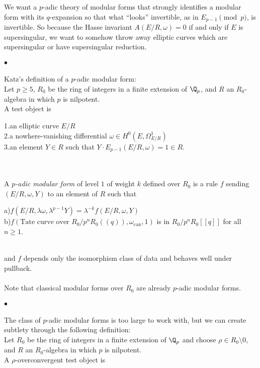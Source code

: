 \documentclass[12pt]{article}
\begin{document}
We want a $p$-adic theory of modular forms that strongly identifies a
modular form with its $q$-expansion so that what ``looks'' invertible, as in
$E_{p-1} \pmod{p}$, is invertible.
So because the Hasse invariant $A(E/R,\omega) = 0$ if and only if $E$ is
supersingular, we want to somehow throw away elliptic curves which are
supersingular or have supersingular reduction.

\paragraph{$\bullet$}
Katz's definition of a $p$-adic modular form:\\
Let $p \geq 5$, $R_0$ be the ring of integers in a finite extension of
$\Q_p$, and $R$ an $R_0$-algebra in which $p$ is nilpotent.
\\
A test object is

\begin{minipage}[c]{6in}
1.\en an elliptic curve $E/R$\\
2.\en a nowhere-vanishing differential $\omega \in H^0(E,\Omega^1_{E/R})$\\
3.\en an element $Y \in R$ such that $Y \cdot E_{p-1}(E/R,\omega) = 1 \in
R$.
\end{minipage}
\\
\\
A \emph{$p$-adic modular form} of level $1$ of weight $k$ defined over $R_0$
is a rule $f$ sending $(E/R,\omega,Y)$ to an element of $R$ such that

\begin{minipage}[c]{6in}
a)\en $f(E/R,\lambda \omega, \lambda^{p-1} Y) = \lambda^{-k}
f(E/R,\omega,Y)$\\
b)\en $f(\text{Tate curve over }R_0/p^n R_0((q)),\omega_{\text{can}},1)$ is
in $R_0/p^n R_0[[q]]$ for all $n \geq 1$.
\end{minipage}
\\
and $f$ depends only the isomorphism class of data and behaves well under
pullback.
\\
\\
Note that classical modular forms over $R_0$ are already $p$-adic modular
forms.

\paragraph{$\bullet$}
The class of $p$-adic modular forms is too large to work with, but we can
create subtlety through the following definition:
\\
Let $R_0$ be the ring of integers in a finite extension of $\Q_p$ and choose
$\rho\in R_0\setminus 0$, and $R$ an $R_0$-algebra in which $p$ is
nilpotent.
\\
A $\rho$-overconvergent test object is
\end{document}
